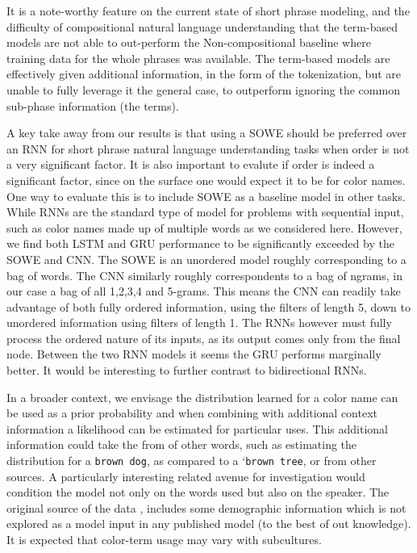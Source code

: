 \documentclass[]{clv3}
\newcommand{\textcite}{\citet}
\newcommand{\natlang}[1]{\texttt{#1}}
\newcommand{\empmodel}{Non-compositional baseline} %
\begin{document}
It is a note-worthy feature on the current state of short phrase modeling,
and the difficulty of compositional natural language understanding
that the term-based models are not able to out-perform the \empmodel{} where training data for the whole phrases was available.
The term-based models are effectively given additional information, in the form of the tokenization, but are unable to fully leverage it the general case, to outperform ignoring the common sub-phase information (the terms).



A key take away from our results is that using a SOWE should be preferred over an RNN for short phrase natural language understanding tasks when order is not a very significant factor.
It is also important to evalute if order is indeed a significant factor, since on the surface one would expect it to be for color names.
One way to evaluate this is to include SOWE as a baseline model in other tasks.
While RNNs are the standard type of model for problems with sequential input, such as color names made up of multiple words as we considered here.
However, we find both LSTM and GRU performance to be significantly exceeded by the SOWE and CNN.
The SOWE is an unordered model roughly corresponding to a bag of words.
The CNN similarly roughly correspondents to a bag of ngrams, in our case a bag of all 1,2,3,4 and 5-grams.
This means the CNN can readily take advantage of both fully ordered information, using the filters of length 5, down to unordered information using  filters of length 1.
The RNNs however must fully process the ordered nature of its inputs, as its output comes only from the final node.
Between the two RNN models it seems the GRU performs marginally better.
It would be interesting to further contrast to bidirectional RNNs.

In a broader context, we envisage the distribution learned for a color name can be used as a prior probability and when combining with additional context information a likelihood can be estimated for particular uses.
This additional information could take the from of other words, such as estimating the distribution for a \natlang{brown dog}, as compared to a `\natlang{brown tree}, or from other sources.
A particularly interesting related avenue for investigation would condition the model not only on the words used but also on the speaker.
The original source of the data \textcite{Munroe2010XKCDdataset}, includes some demographic information which is not explored as a model input in any  published model (to the best of out knowledge).
It is expected that color-term usage may vary with subcultures.


\clearpage


\clearpage
\appendix

\end{document}

